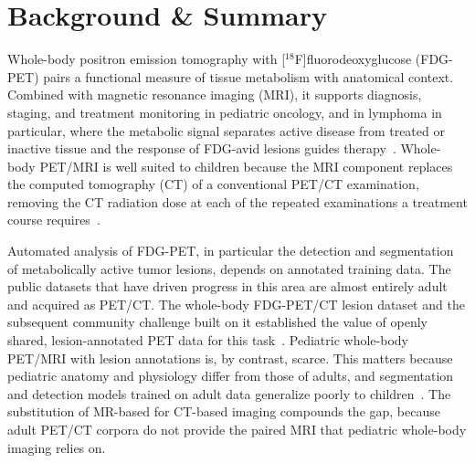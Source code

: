 
\section*{Background \& Summary}\label{sec:background}

Whole-body positron emission tomography with [$^{18}$F]fluorodeoxyglucose (FDG-PET) pairs a functional measure of tissue metabolism with anatomical context.
Combined with magnetic resonance imaging (MRI), it supports diagnosis, staging, and treatment monitoring in pediatric oncology, and in lymphoma in particular, where the metabolic signal separates active disease from treated or inactive tissue and the response of FDG-avid lesions guides therapy~\cite{Kurch_2021,Barrington_2014,Barrington_2017}.
Whole-body PET/MRI is well suited to children because the MRI component replaces the computed tomography (CT) of a conventional PET/CT examination, removing the CT radiation dose at each of the repeated examinations a treatment course requires~\cite{Masselli_2025,Brenner_2007,GalloBernal_2025}.

Automated analysis of FDG-PET, in particular the detection and segmentation of metabolically active tumor lesions, depends on annotated training data.
The public datasets that have driven progress in this area are almost entirely adult and acquired as PET/CT.
The whole-body FDG-PET/CT lesion dataset and the subsequent community challenge built on it established the value of openly shared, lesion-annotated PET data for this task~\cite{Gatidis_2022,Gatidis_2024}.
Pediatric whole-body PET/MRI with lesion annotations is, by contrast, scarce.
This matters because pediatric anatomy and physiology differ from those of adults, and segmentation and detection models trained on adult data generalize poorly to children~\cite{Chatterjee_2025,Laborie_2026}.
The substitution of MR-based for CT-based imaging compounds the gap, because adult PET/CT corpora do not provide the paired MRI that pediatric whole-body imaging relies on.

